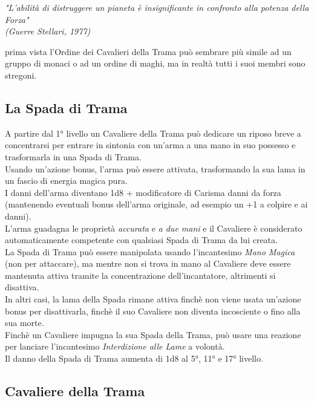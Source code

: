 \begin{DndReadAloud}
  \it
  "L'abilità di distruggere un pianeta è insignificante in confronto alla potenza della Forza" \\ (Guerre Stellari, 1977)
\end{DndReadAloud}

 prima vista l'Ordine dei Cavalieri della Trama può sembrare più simile ad un gruppo di monaci o ad un ordine di maghi, ma in realtà tutti i suoi membri sono stregoni.

\subsection{La Spada di Trama}

A partire dal 1° livello un Cavaliere della Trama può dedicare un riposo breve a concentrarsi per entrare in sintonia con un'arma a una mano in suo possesso e trasformarla in una Spada di Trama. \\ Usando un'azione bonus, l'arma può essere attivata, trasformando la sua lama in un fascio di energia magica pura. \\ I danni dell'arma diventano 1d8 + modificatore di Carisma danni da forza (mantenendo eventuali bonus dell'arma originale, ad esempio un +1 a colpire e ai danni). \\ L'arma guadagna le proprietà \textit{accurata} e \textit{a due mani} e il Cavaliere è considerato automaticamente competente con qualsiasi Spada di Trama da lui creata. \\ La Spada di Trama può essere manipolata usando l'incantesimo \textit{Mano Magica} (non per attaccare), ma mentre non si trova in mano al Cavaliere deve essere mantenuta attiva tramite la concentrazione dell'incantatore, altrimenti si disattiva. \\ In altri casi, la lama della Spada rimane attiva finchè non viene usata un'azione bonus per disattivarla, finchè il suo Cavaliere non diventa incosciente o fino alla sua morte. \\ Finchè un Cavaliere impugna la sua Spada della Trama, può usare una reazione per lanciare l'incantesimo \textit{Interdizione alle Lame} a volontà. \\ Il danno della Spada di Trama aumenta di 1d8 al 5°, 11° e 17° livello.

\subsection{Cavaliere della Trama}

